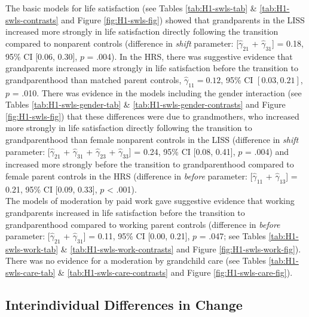 \documentclass[
  english,
  man, noextraspace]{apa7}
\begin{document}
The basic models for life satisfaction (see Tables \ref{tab:H1-swls-tab} \& \ref{tab:H1-swls-contrasts} and Figure \ref{fig:H1-swls-fig}) showed that grandparents in the LISS increased more strongly in life satisfaction directly following the transition compared to nonparent controls (difference in \emph{shift} parameter: {[}\(\hat{\gamma}_{21}\) + \(\hat{\gamma}_{31}\){]} = 0.18, 95\% CI {[}0.06, 0.30{]}, \(p\) = .004). In the HRS, there was suggestive evidence that grandparents increased more strongly in life satisfaction before the transition to grandparenthood than matched parent controls, \(\hat{\gamma}_{11} = 0.12\), 95\% CI \([0.03, 0.21]\), \(p\) = .010. There was evidence in the models including the gender interaction (see Tables \ref{tab:H1-swls-gender-tab} \& \ref{tab:H1-swls-gender-contrasts} and Figure \ref{fig:H1-swls-fig}) that these differences were due to grandmothers, who increased more strongly in life satisfaction directly following the transition to grandparenthood than female nonparent controls in the LISS (difference in \emph{shift} parameter: {[}\(\hat{\gamma}_{21}\) + \(\hat{\gamma}_{31}\) + \(\hat{\gamma}_{23}\) + \(\hat{\gamma}_{33}\){]} = 0.24, 95\% CI {[}0.08, 0.41{]}, \(p\) = .004) and increased more strongly before the transition to grandparenthood compared to female parent controls in the HRS (difference in \emph{before} parameter: {[}\(\hat{\gamma}_{11}\) + \(\hat{\gamma}_{13}\){]} = 0.21, 95\% CI {[}0.09, 0.33{]}, \(p\) \textless{} .001).\\
The models of moderation by paid work gave suggestive evidence that working grandparents increased in life satisfaction before the transition to grandparenthood compared to working parent controls (difference in \emph{before} parameter: {[}\(\hat{\gamma}_{21}\) + \(\hat{\gamma}_{31}\){]} = 0.11, 95\% CI {[}0.00, 0.21{]}, \(p\) = .047; see Tables \ref{tab:H1-swls-work-tab} \& \ref{tab:H1-swls-work-contrasts} and Figure \ref{fig:H1-swls-work-fig}). There was no evidence for a moderation by grandchild care (see Tables \ref{tab:H1-swls-care-tab} \& \ref{tab:H1-swls-care-contrasts} and Figure \ref{fig:H1-swls-care-fig}).

\hypertarget{interindividual-differences-in-change}{%
\subsection{Interindividual Differences in Change}\label{interindividual-differences-in-change}}
\end{document}
